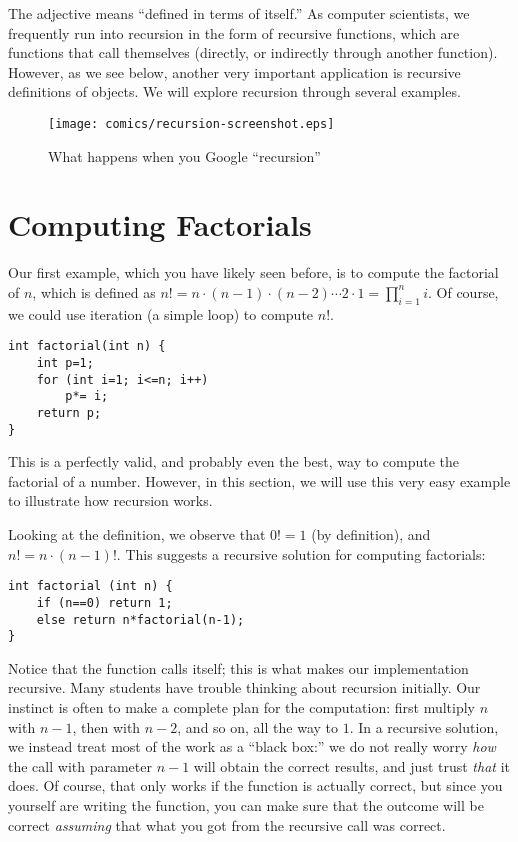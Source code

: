 The adjective  means ``defined in terms of itself.''
As computer scientists, we frequently run into recursion in the form
of recursive functions, which are functions that call themselves
(directly, or indirectly through another function).
However, as we see below, another very important
application is recursive definitions of objects.
We will explore recursion through several examples.

\begin{figure}[htb]
\centering
\texttt{[image: comics/recursion-screenshot.eps]}
\caption{What happens when you Google ``recursion''}
\end{figure}


\section{Computing Factorials}
Our first example, which you have likely seen before,
is to compute the factorial of $n$, which is defined 
as $n! = n \cdot (n-1) \cdot (n-2) \cdots 2 \cdot 1 = \prod_{i=1}^n i$.
Of course, we could use iteration (a simple  loop) to
compute $n!$.
\begin{verbatim}
int factorial(int n) {
    int p=1;
    for (int i=1; i<=n; i++)
        p*= i;
    return p;
}
\end{verbatim}

This is a perfectly valid, and probably even the best,
way to compute the factorial of a number.
However, in this section, we will use this very easy example
to illustrate how recursion works.

Looking at the definition, we observe that $0! = 1$ (by definition),
and $n! = n \cdot (n-1)!$.
This suggests a recursive solution for computing factorials:

\begin{verbatim}
int factorial (int n) {
    if (n==0) return 1;
    else return n*factorial(n-1);
}
\end{verbatim}

Notice that the function  calls itself;
this is what makes our implementation recursive.
Many students have trouble thinking about recursion initially.
Our instinct is often to make a complete plan for the computation:
first multiply $n$ with $n-1$, then with $n-2$, and so on,
all the way to $1$. 
In a recursive solution, we instead treat most of the work as a
``black box:'' we do not really worry \emph{how} the call with
parameter $n-1$ will obtain the correct results, and just trust
\emph{that} it does.
Of course, that only works if the function is actually correct,
but since you yourself are writing the function, you can make sure
that the outcome will be correct \emph{assuming} that what you got
from the recursive call was correct.

